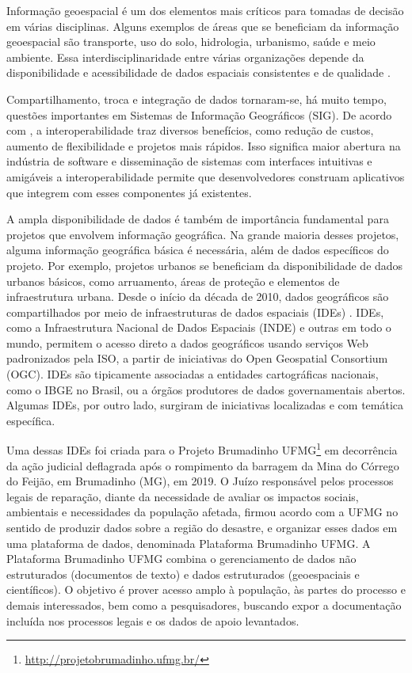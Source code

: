 Informação geoespacial é um dos elementos mais críticos para tomadas de decisão em várias disciplinas. Alguns exemplos de áreas que se beneficiam da informação geoespacial são transporte, uso do solo, hidrologia, urbanismo, saúde e meio ambiente. Essa interdisciplinaridade entre várias organizações depende da disponibilidade e acessibilidade de dados espaciais consistentes e de qualidade \citep{abbas}.

Compartilhamento, troca e integração de dados tornaram-se, há muito tempo, questões importantes em Sistemas de Informação Geográficos (SIG). De acordo com \cite{goodchild2012interoperating}, a interoperabilidade traz diversos benefícios, como redução de custos, aumento de flexibilidade e projetos mais rápidos. Isso significa maior abertura na indústria de software e disseminação de sistemas com interfaces intuitivas e amigáveis a interoperabilidade permite que desenvolvedores construam aplicativos que integrem com esses componentes já existentes. 

A ampla disponibilidade de dados é também de importância fundamental para projetos que envolvem informação geográfica. Na grande maioria desses projetos, alguma informação geográfica básica é necessária, além de dados específicos do projeto. Por exemplo, projetos urbanos se beneficiam da disponibilidade de dados urbanos básicos, como arruamento, áreas de proteção e elementos de infraestrutura urbana. Desde o início da década de 2010, dados geográficos são compartilhados por meio de infraestruturas de dados espaciais (IDEs) \citep{masser2019geographic}. IDEs, como a Infraestrutura Nacional de Dados Espaciais (INDE) e outras em todo o mundo, permitem o acesso direto a dados geográficos usando serviços Web padronizados pela ISO, a partir de iniciativas do Open Geospatial Consortium (OGC). IDEs são tipicamente associadas a entidades cartográficas nacionais, como o IBGE no Brasil, ou a órgãos produtores de dados governamentais abertos. Algumas IDEs, por outro lado, surgiram de iniciativas localizadas e com temática específica.

Uma dessas IDEs foi criada para o Projeto Brumadinho UFMG\footnote{\url{http://projetobrumadinho.ufmg.br/}}
 em decorrência da ação judicial deflagrada após o rompimento da barragem da Mina do Córrego do Feijão, em Brumadinho (MG), em 2019. O Juízo responsável pelos processos legais de reparação, diante da necessidade de avaliar os impactos sociais, ambientais e necessidades da população afetada, firmou acordo com a UFMG no sentido de produzir dados sobre a região do desastre, e organizar esses dados em uma plataforma de dados, denominada Plataforma Brumadinho UFMG. A Plataforma Brumadinho UFMG combina o gerenciamento de dados não estruturados (documentos de texto) e dados estruturados (geoespaciais e científicos). O objetivo é prover acesso amplo à população, às partes do processo e demais interessados, bem como a pesquisadores, buscando expor a documentação incluída nos processos legais e os dados de apoio levantados.
 
